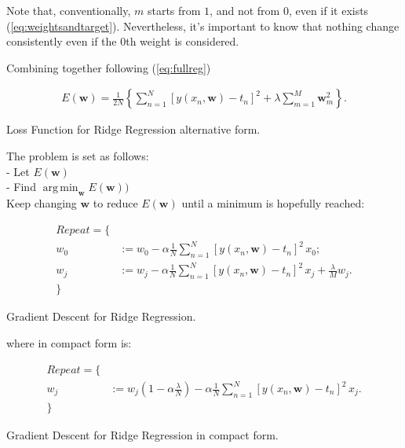 \noindent Note that, conventionally, $m$ starts from $1$, and not from $0$, even if it exists (\ref{eq:weightsandtarget}). Nevertheless, it's important to know that nothing change consistently even if the 0th weight is considered. 

\noindent Combining together following (\ref{eq:fullreg}) 

\begin{Equation}[H]
	\centering
	\begin{equation} \label{eq:fullregnew}
	\begin{aligned}
	E(\bm{w}) = \frac{1}{2N} \left\{ \sum_{n=1}^{N} [ y(x_n, \bm{w})-t_n ]^2 + \lambda \sum_{m=1}^{M} {\bm{w}^2_m} \right\} .
	\end{aligned}
	\end{equation}
	\caption[Loss Function for Ridge Regression alternative form.]{Loss Function for Ridge Regression alternative form.}
\end{Equation}

\noindent The problem is set as follows: \\
\noindent - Let $E(\bm{w})$ \\
\noindent - Find $\operatorname*{arg\,min}_{\bm{w}}  E(\bm{w}))$ \\

\noindent Keep changing $\bm{w}$ to reduce $E(\bm{w})$ until a minimum is hopefully reached:

\begin{Equation}[H]
	\centering
	\begin{equation} \label{eq:graddesc}
		\begin{aligned}
			Repeat = \{ \\
				w_0 &:= w_0 - \alpha \frac{1}{N} \sum_{n=1}^{N} [ y(x_n, \bm{w})-t_n ]^2 \, x_0 ; \\
				w_j &:= w_j - \alpha \frac{1}{N} \sum_{n=1}^{N} [ y(x_n, \bm{w})-t_n ]^2 \, x_j + \frac{\lambda}{M} w_j .\\
			\}
		\end{aligned}
	\end{equation}
	\caption[Gradient Descent for Ridge Regression.]{Gradient Descent for Ridge Regression.}
\end{Equation}

\noindent where in compact form is:
\begin{Equation}[H]
	\centering
	\begin{equation} \label{eq:graddesccompact}
	\begin{aligned}
		Repeat = \{ \\
			w_j &:= w_j(1-\alpha \frac{\lambda}{N}) - \alpha \frac{1}{N} \sum_{n=1}^{N} [ y(x_n, \bm{w})-t_n ]^2 \, x_j .\\
		\}
	\end{aligned}
	\end{equation}
	\caption[Gradient Descent for Ridge Regression in compact form.]{Gradient Descent for Ridge Regression in compact form.}
\end{Equation}

